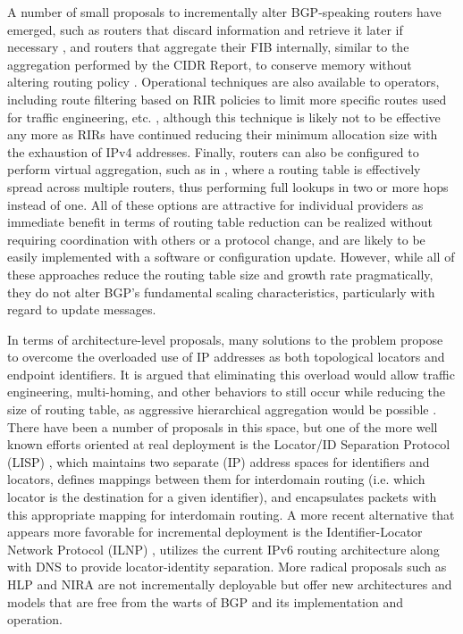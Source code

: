 A number of small proposals to incrementally alter BGP-speaking routers have emerged, such as routers that discard information and retrieve it later if necessary \cite{Karpilovsky:2006ys}, and routers that aggregate their FIB internally, similar to the aggregation performed by the CIDR Report, to conserve memory without altering routing policy \cite{Zhao:2010vn}. Operational techniques are also available to operators, including route filtering based on RIR policies to limit more specific routes used for traffic engineering, etc. \cite{Bellovin:2001qf}, although this technique is likely not to be effective any more as RIRs have continued reducing their minimum allocation size with the exhaustion of IPv4 addresses. Finally, routers can also be configured to perform virtual aggregation, such as in \cite{Ballani:2009tg}, where a routing table is effectively spread across multiple routers, thus performing full lookups in two or more hops instead of one. All of these options are attractive for individual providers as immediate benefit in terms of routing table reduction can be realized without requiring coordination with others or a protocol change, and are likely to be easily implemented with a software or configuration update. However, while all of these approaches reduce the routing table size and growth rate pragmatically, they do not alter BGP's fundamental scaling characteristics, particularly with regard to update messages.

In terms of architecture-level proposals, many solutions to the problem propose to overcome the overloaded use of IP addresses as both topological locators and endpoint identifiers. It is argued that eliminating this overload would allow traffic engineering, multi-homing, and other behaviors to still occur while reducing the size of routing table, as aggressive hierarchical aggregation would be possible \cite{Quoitin:2007uq}. There have been a number of proposals in this space, but one of the more well known efforts oriented at real deployment is the Locator/ID Separation Protocol (LISP) \cite{lisp-id}, which maintains two separate (IP) address spaces for identifiers and locators, defines mappings between them for interdomain routing (i.e. which locator is the destination for a given identifier), and encapsulates packets with this appropriate mapping for interdomain routing. A more recent alternative that appears more favorable for incremental deployment is the Identifier-Locator Network Protocol (ILNP) \cite{Atkinson:2010zr}, utilizes the current IPv6 routing architecture along with DNS to provide locator-identity separation. More radical proposals such as HLP \cite{Subramanian:2005ve} and NIRA \cite{Yang:2007cr} are not incrementally deployable but offer new architectures and models that are free from the warts of BGP and its implementation and operation. 

